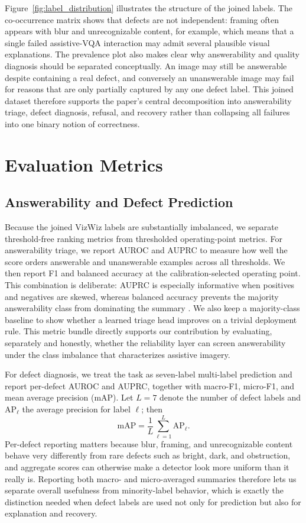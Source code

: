 \documentclass{ieeeaccess}
\begin{document}
Figure~\ref{fig:label_distribution} illustrates the structure of the joined labels. The co-occurrence matrix shows that defects are not independent: framing often appears with blur and unrecognizable content, for example, which means that a single failed assistive-VQA interaction may admit several plausible visual explanations. The prevalence plot also makes clear why answerability and quality diagnosis should be separated conceptually. An image may still be answerable despite containing a real defect, and conversely an unanswerable image may fail for reasons that are only partially captured by any one defect label. This joined dataset therefore supports the paper's central decomposition into answerability triage, defect diagnosis, refusal, and recovery rather than collapsing all failures into one binary notion of correctness.

\section{Evaluation Metrics}
\label{sec:metrics}

\subsection{Answerability and Defect Prediction}
Because the joined VizWiz labels are substantially imbalanced, we separate threshold-free ranking metrics from thresholded operating-point metrics. For answerability triage, we report AUROC and AUPRC to measure how well the score orders answerable and unanswerable examples across all thresholds. We then report F1 and balanced accuracy at the calibration-selected operating point. This combination is deliberate: AUPRC is especially informative when positives and negatives are skewed, whereas balanced accuracy prevents the majority answerability class from dominating the summary \cite{saito2015prroc}. We also keep a majority-class baseline to show whether a learned triage head improves on a trivial deployment rule. This metric bundle directly supports our contribution by evaluating, separately and honestly, whether the reliability layer can screen answerability under the class imbalance that characterizes assistive imagery.

For defect diagnosis, we treat the task as seven-label multi-label prediction and report per-defect AUROC and AUPRC, together with macro-F1, micro-F1, and mean average precision (mAP). Let $L=7$ denote the number of defect labels and $\mathrm{AP}_{\ell}$ the average precision for label $\ell$; then
\begin{equation}
\mathrm{mAP} = \frac{1}{L}\sum_{\ell=1}^{L} \mathrm{AP}_{\ell}.
\end{equation}
Per-defect reporting matters because blur, framing, and unrecognizable content behave very differently from rare defects such as bright, dark, and obstruction, and aggregate scores can otherwise make a detector look more uniform than it really is. Reporting both macro- and micro-averaged summaries therefore lets us separate overall usefulness from minority-label behavior, which is exactly the distinction needed when defect labels are used not only for prediction but also for explanation and recovery.
\end{document}
